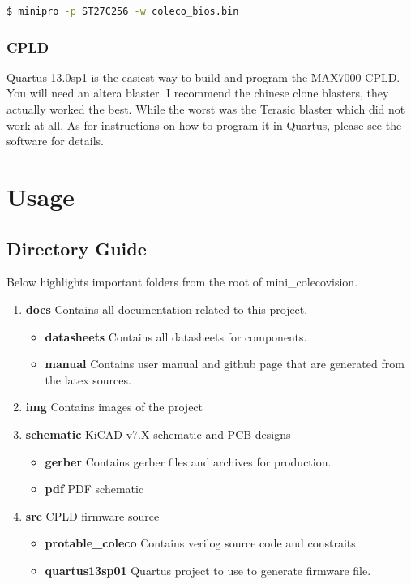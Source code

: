   \begin{lstlisting}[language=bash]
$ minipro -p ST27C256 -w coleco_bios.bin
  \end{lstlisting}

\subsubsection{CPLD}

\par
Quartus 13.0sp1 is the easiest way to build and program the MAX7000 CPLD. You will need an altera blaster.
I recommend the chinese clone blasters, they actually worked the best. While the worst was the Terasic blaster
which did not work at all. As for instructions on how to program it in Quartus, please see the software for details.

\newpage

\section{Usage}

\subsection{Directory Guide}

\par
Below highlights important folders from the root of mini\_colecovision.

\begin{enumerate}
  \item \textbf{docs} Contains all documentation related to this project.
    \begin{itemize}
      \item \textbf{datasheets} Contains all datasheets for components.
      \item \textbf{manual} Contains user manual and github page that are generated from the latex sources.
    \end{itemize}
  \item \textbf{img} Contains images of the project
  \item \textbf{schematic} KiCAD v7.X schematic and PCB designs
    \begin{itemize}
      \item \textbf{gerber} Contains gerber files and archives for production.
      \item \textbf{pdf} PDF schematic
    \end{itemize}
  \item \textbf{src} CPLD firmware source
    \begin{itemize}
      \item \textbf{protable\_coleco} Contains verilog source code and constraits
      \item \textbf{quartus13sp01} Quartus project to use to generate firmware file.
    \end{itemize}
\end{enumerate}
